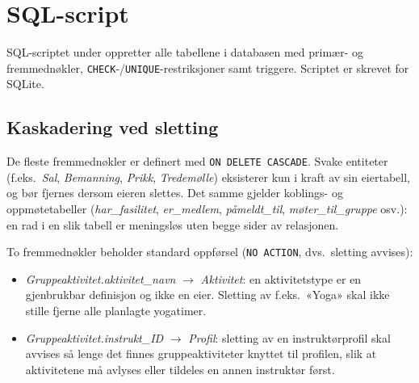 \section{SQL-script}

SQL-scriptet under oppretter alle tabellene i databasen med primær- og
fremmednøkler, \texttt{CHECK}-/\texttt{UNIQUE}-restriksjoner samt triggere.
Scriptet er skrevet for SQLite.



\subsection{Kaskadering ved sletting}

De fleste fremmednøkler er definert med \texttt{ON DELETE CASCADE}.
Svake entiteter (f.eks.\ \textit{Sal}, \textit{Bemanning}, \textit{Prikk},
\textit{Tredemølle}) eksisterer kun i kraft av sin eiertabell, og bør
fjernes dersom eieren slettes.
Det samme gjelder koblings- og oppmøtetabeller
(\textit{har\_fasilitet}, \textit{er\_medlem}, \textit{påmeldt\_til},
\textit{møter\_til\_gruppe} osv.): en rad i en slik tabell er meningsløs
uten begge sider av relasjonen.

To fremmednøkler beholder standard oppførsel (\texttt{NO ACTION}, dvs.\ sletting
avvises):
\begin{itemize}[noitemsep]
    \item \textit{Gruppeaktivitet.aktivitet\_navn} $\rightarrow$ \textit{Aktivitet}:
          en aktivitetstype er en gjenbrukbar definisjon og ikke en eier.
          Sletting av f.eks.\ «Yoga» skal ikke stille fjerne alle planlagte
          yogatimer.
    \item \textit{Gruppeaktivitet.instrukt\_ID} $\rightarrow$ \textit{Profil}:
          sletting av en instruktørprofil skal avvises så lenge det finnes
          gruppeaktiviteter knyttet til profilen, slik at aktivitetene må
          avlyses eller tildeles en annen instruktør først.
\end{itemize}

